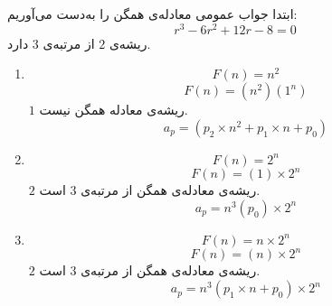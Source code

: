 	\p
ابتدا جواب عمومی معادله‌ی همگن را به‌دست می‌آوریم:
$$r^3 - 6r^2 + 12r - 8 = 0$$
ریشه‌ی
$2$
از مرتبه‌ی
$3$
دارد.
\begin{enumerate}
\item
$$F(n) = n^2$$
$$F(n) = (n^2)(1^n)$$
$1$
ریشه‌ی معادله همگن نیست.
$$a_p = (p_2 \times n^2 + p_1 \times n + p_0)$$
\item
$$F(n) = 2^n$$
$$F(n) = (1) \times 2^n$$
$2$
ریشه‌ی معادله‌ی همگن از مرتبه‌ی
$3$
است.
$$a_p = n^3(p_0) \times 2^n$$
\item
$$F(n) = n \times 2^n$$
$$F(n) = (n) \times 2^n$$
$2$
ریشه‌ی معادله‌ی همگن از مرتبه‌ی
$3$
است.
$$a_p = n^3(p_1 \times n + p_0)\times2^n$$
\end{enumerate}
